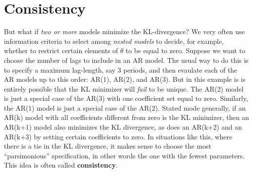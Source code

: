 \section{Consistency}
But what if \emph{two or more} models minimize the KL-divergence? We very often use information criteria to select among \emph{nested models} to decide, for example, whether to restrict certain elements of $\theta$ to be equal to zero. Suppose we want to choose the number of lags to include in an AR model. The usual way to do this is to specify a maximum lag-length, say 3 periods, and then evaulate each of the AR models up to this order: AR(1), AR(2), and AR(3). But in this example is is entirely possible that the KL minimizer will \emph{fail} to be unique. The AR(2) model is just a special case of the AR(3) with one coefficient set equal to zero. Similarly, the AR(1) model is just a special case of the AR(2). Stated mode generally, if an AR(k) model with all coefficients different from zero is the KL minimizer, then an AR(k+1) model also minimizes the KL divergence, as does an AR(k+2) and an AR(k+3) by setting certain coefficients to zero. In situations like this, where there is a tie in the KL divergence, it makes sense to choose the most ``parsimonious'' specification, in other words the one with the fewest parameters. This idea is often called \textbf{consistency}.


